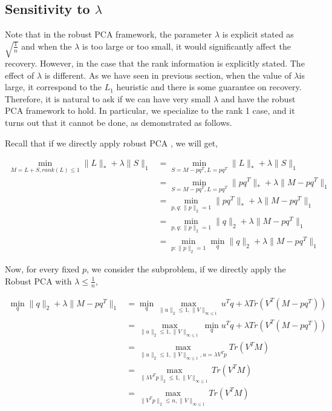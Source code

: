 \subsection{Sensitivity to $\lambda$}

Note that in the robust PCA framework, the parameter $\lambda$ is
explicit stated as $\sqrt{\frac{1}{n}}$ and when the $\lambda$ is
too large or too small, it would significantly affect the recovery.
However, in the case that the rank information is explicitly stated.
The effect of $\lambda$ is different. As we have seen in previous
section, when the value of $\lambda$is large, it correspond to the
$L_{1}$ heuristic and there is some guarantee on recovery. Therefore,
it is natural to ask if we can have very small $\lambda$ and have
the robust PCA framework to hold. In particular, we specialize to
the rank 1 case, and it turns out that it cannot be done, as demonstrated
as follows.

Recall that if we directly apply robust PCA , we will get,

\begin{align*}
 \min_{M=L+S,rank(L)\le1}\|L\|_{*}+\lambda\|S\|_{1}
 & = \min_{S=M-pq^{T},L=pq^{T}}\|L\|_{*}+\lambda\|S\|_{1} \\
 & = \min_{S=M-pq^{T},L=pq^{T}}\|pq^{T}\|_{*}+\lambda\|M-pq^{T}\|_{1} \\
 & = \min_{p,q:\|p\|_{2}=1}\|pq^{T}\|_{*}+\lambda\|M-pq^{T}\|_{1} \\
 & = \min_{p,q:\|p\|_{2}=1}\|q\|_{2}+\lambda\|M-pq^{T}\|_{1} \\
 & = \min_{p:\|p\|_{2}=1}\min_{q}\|q\|_{2}+\lambda\|M-pq^{T}\|_{1}
\end{align*}


Now, for every fixed $p$, we consider the subproblem, if we directly
apply the Robust PCA with $\lambda\le\frac{1}{n}$,

\begin{align*}
\min_{q}\|q\|_{2}+\lambda\|M-pq^{T}\|_{1}
& = \min_{q}\max_{\|u\|_{2}\le1,\|V\|_{\infty\le1}}u^{T}q+\lambda Tr(V^{T}(M-pq^{T})) \\
& = \max_{\|u\|_{2}\le1,\|V\|_{\infty\le1}}\min_{q}u^{T}q+\lambda Tr(V^{T}(M-pq^{T})) \\
& = \max_{\|u\|_{2}\le1,\|V\|_{\infty\le1},u=\lambda V^{T}p}Tr(V^{T}M) \\
& = \max_{\|\lambda V^{T}p\|_{2}\le1,\|V\|_{\infty\le1}}Tr(V^{T}M) \\
& = \max_{\|V^{T}p\|_{2}\le n,\|V\|_{\infty\le1}}Tr(V^{T}M)
\end{align*}


